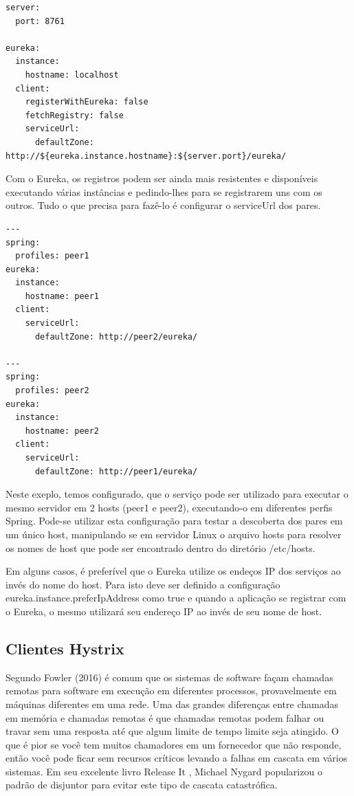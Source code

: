 \begin{verbatim}
server:
  port: 8761

eureka:
  instance:
    hostname: localhost
  client:
    registerWithEureka: false
    fetchRegistry: false
    serviceUrl:
      defaultZone: http://${eureka.instance.hostname}:${server.port}/eureka/
\end{verbatim}

Com o Eureka, os registros podem ser ainda mais resistentes e disponíveis executando várias instâncias e pedindo-lhes para se registrarem uns com os outros. Tudo o que precisa para fazê-lo é configurar o serviceUrl dos pares.

\begin{verbatim}
---
spring:
  profiles: peer1
eureka:
  instance:
    hostname: peer1
  client:
    serviceUrl:
      defaultZone: http://peer2/eureka/

---
spring:
  profiles: peer2
eureka:
  instance:
    hostname: peer2
  client:
    serviceUrl:
      defaultZone: http://peer1/eureka/
\end{verbatim}

Neste exeplo, temos configurado, que o serviço pode ser utilizado para executar o mesmo servidor em 2 hosts (peer1 e peer2), executando-o em diferentes perfis Spring. Pode-se utilizar esta configuração para testar a descoberta dos pares em um único host, manipulando se em servidor Linux o arquivo hosts para resolver os nomes de host que pode ser encontrado dentro do diretório /etc/hosts.

Em alguns casos, é preferível que o Eureka utilize os endeços IP dos serviços ao invés do nome do host. Para isto deve ser definido a configuração eureka.instance.preferIpAddress como true e quando a aplicação se registrar com o Eureka, o mesmo utilizará seu endereço IP ao invés de seu nome de host.

\subsection{Clientes Hystrix}

Segundo Fowler (2016) é comum que os sistemas de software façam chamadas remotas para software em execução em diferentes processos, provavelmente em máquinas diferentes em uma rede. Uma das grandes diferenças entre chamadas em memória e chamadas remotas é que chamadas remotas podem falhar ou travar sem uma resposta até que algum limite de tempo limite seja atingido. O que é pior se você tem muitos chamadores em um fornecedor que não responde, então você pode ficar sem recursos críticos levando a falhas em cascata em vários sistemas. Em seu excelente livro Release It  , Michael Nygard popularizou o padrão de disjuntor para evitar este tipo de cascata catastrófica.

